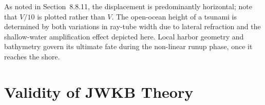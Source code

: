 As noted in Section~8.8.11, the displacement is predominantly horizontal;
note that $V/10$ is plotted rather than $V$.  The open-ocean height of a
tsunami is determined by both variations in ray-tube width due to lateral
refraction and the shallow-water amplification effect depicted here.
Local harbor geometry and bathymetry govern its ultimate fate during
the non-linear runup phase, once it reaches the shore.
%

\renewcommand{\thesection}{$\!\!\!\raise1.3ex\hbox{$\star$}\!\!$
\arabic{chapter}.\arabic{section}}
\section{Validity of JWKB Theory}
%
\renewcommand{\thesection}{\arabic{chapter}.\arabic{section}}

